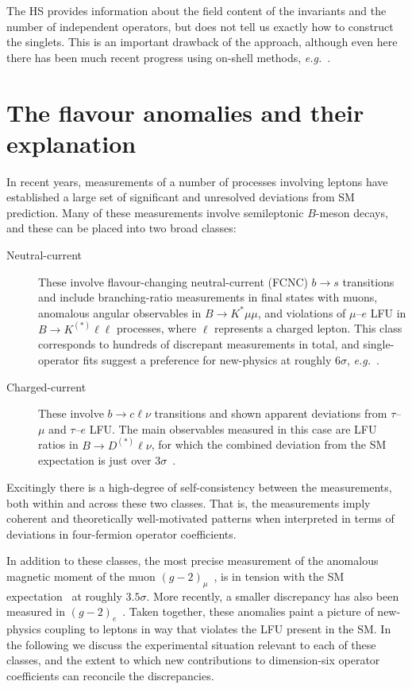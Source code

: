 The HS provides information about the field content of the invariants and the
number of independent operators, but does not tell us exactly how to construct
the singlets. This is an important drawback of the approach, although even here
there has been much recent progress using on-shell methods,
\textit{e.g.}~\cite{Ma:2019gtx, Henning:2019enq, Li:2020gnx, Li:2020xlh}.



\section{The flavour anomalies and their explanation}
\label{sec:ch1-flavour-anomalies}

In recent years, measurements of a number of processes involving leptons have
established a large set of significant and unresolved deviations from SM
prediction. Many of these measurements involve semileptonic $B$-meson decays,
and these can be placed into two broad classes:
\begin{description}
  \item[Neutral-current] These involve flavour-changing neutral-current (FCNC) $b \to s$ transitions and include branching-ratio measurements in final states with muons, anomalous angular observables in $B \to K^{*} \mu\mu$, and violations of $\mu$--$e$ LFU in $B \to K^{(*)} \ell \ell$ processes, where $\ell$ represents a charged lepton. This class corresponds to hundreds of discrepant measurements in total, and single-operator fits suggest a preference for new-physics at roughly $6\sigma$, \textit{e.g.}~\cite{Aebischer:2019mlg}.
  \item[Charged-current] These involve $b \to c \ell \nu$ transitions and shown apparent deviations from $\tau$--$\mu$ and $\tau$--$e$ LFU. The main observables measured in this case are LFU ratios in $B \to D^{(*)} \ell \nu$, for which the combined deviation from the SM expectation is just over $3\sigma$~\cite{Amhis:2019ckw}.
\end{description}
Excitingly there is a high-degree of self-consistency between the measurements,
both within and across these two classes. That is, the measurements imply
coherent and theoretically well-motivated patterns when interpreted in terms of
deviations in four-fermion operator coefficients.

In addition to these classes, the most precise measurement of the anomalous
magnetic moment of the muon $(g-2)_{\mu}$~\cite{Bennett:2006fi}, is in tension
with the SM expectation~\cite{Blum:2013xva} at roughly $3.5\sigma$. More
recently, a smaller discrepancy has also been measured in
$(g-2)_{e}$~\cite{Articleparker}. Taken together, these anomalies paint a picture
of new-physics coupling to leptons in way that violates the LFU present in the
SM. In the following we discuss the experimental situation relevant to each of
these classes, and the extent to which new contributions to dimension-six
operator coefficients can reconcile the discrepancies.

